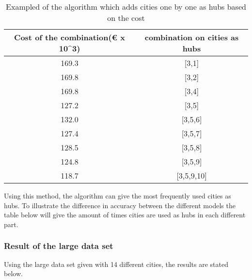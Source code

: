 \documentclass{article}
\begin{document}
    \begin{table}[h!]
        \begin{center}
            \begin{tabular}{||c |c||} 
                \hline
                Cost of the combination(€ x 10^3) & combination on cities as hubs \\ [0.5ex] 
                \hline\hline
                169.3 & [3,1]  \\ 
                \hline
                169.8 & [3,2]  \\
                \hline
                169.8 & [3,4]  \\
                \hline
                127.2 & [3,5]  \\ 
                \hline
                132.0 & [3,5,6]  \\
                \hline
                127.4 & [3,5,7]  \\
                \hline
                128.5 & [3,5,8]  \\
                \hline
                124.8 & [3,5,9]  \\
                \hline
                118.7 & [3,5,9,10]  \\
                [1ex] 
                \hline
              \end{tabular}
          \end{center}
        \caption{Exampled of the algorithm which adds cities one by one as hubs based on the cost}
        \label{Collection Algorithm}
    \end{table}

    Using this method, the algorithm can give the most frequently used cities as hubs. To illustrate the difference in accuracy between the different models the table below will give the amount of times cities are used as hubs in each different part.%
    
        \subsubsection{Result of the large data set}
    
            Using the large data set given with 14 different cities, the results are stated below. 
    
\end{document}
